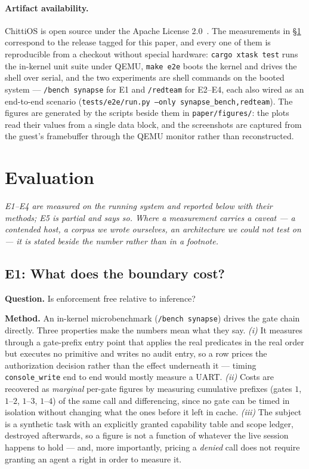 \documentclass[11pt]{article}
\newcommand{\os}{ChittiOS}
\newcommand{\code}[1]{\texttt{#1}}
\begin{document}
\paragraph{Artifact availability.} \os{} is open source under the Apache
License 2.0~\cite{chittios}. The measurements in \S\ref{sec:eval} correspond to
the release tagged for this paper, and every one of them is reproducible from a
checkout without special hardware: \code{cargo xtask test} runs the in-kernel unit suite under QEMU,
\code{make e2e} boots the kernel and drives the shell over serial, and the two
experiments are shell commands on the booted system --- \code{/bench synapse} for
E1 and \code{/redteam} for E2--E4, each also wired as an end-to-end scenario
(\code{tests/e2e/run.py --only synapse\_bench,redteam}). The figures are
generated by the scripts beside them in \code{paper/figures/}: the plots read
their values from a single data block, and the screenshots are captured from the
guest's framebuffer through the QEMU monitor rather than reconstructed.

\section{Evaluation}
\label{sec:eval}

\emph{E1--E4 are measured on the running system and reported below with their
methods; E5 is partial and says so. Where a measurement carries a caveat --- a
contended host, a corpus we wrote ourselves, an architecture we could not test
on --- it is stated beside the number rather than in a footnote.}

\subsection{E1: What does the boundary cost?}
\label{sec:e1}

\textbf{Question.} Is enforcement free relative to inference?

\textbf{Method.} An in-kernel microbenchmark (\code{/bench synapse}) drives the
gate chain directly. Three properties make the numbers mean what they say.
\emph{(i)} It measures through a gate-prefix entry point that applies the real
predicates in the real order but executes no primitive and writes no audit
entry, so a row prices the authorization decision rather than the effect
underneath it --- timing \code{console\_write} end to end would mostly measure a
UART. \emph{(ii)} Costs are recovered as \emph{marginal} per-gate figures by
measuring cumulative prefixes (gates $1$, $1$--$2$, $1$--$3$, $1$--$4$) of the
same call and differencing, since no gate can be timed in isolation without
changing what the ones before it left in cache. \emph{(iii)} The subject is a
synthetic task with an explicitly granted capability table and scope ledger,
destroyed afterwards, so a figure is not a function of whatever the live
session happens to hold --- and, more importantly, pricing a \emph{denied} call
does not require granting an agent a right in order to measure it.
\end{document}
